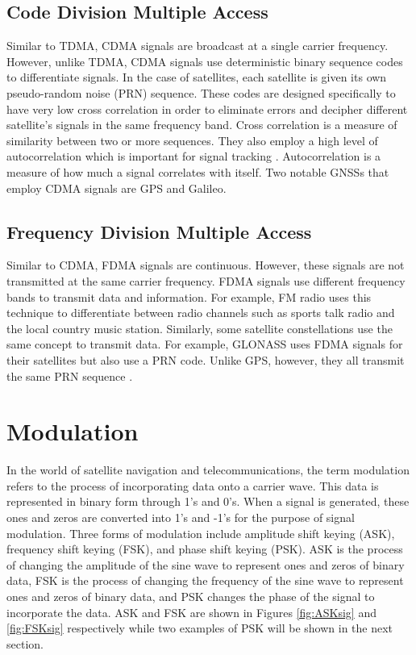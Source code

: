 \documentclass[12pt]{report}
\begin{document}
\subsection{Code Division Multiple Access}

Similar to TDMA, CDMA signals are broadcast at a single carrier frequency. However, unlike TDMA, CDMA signals use deterministic binary sequence codes to differentiate signals. In the case of satellites, each satellite is given its own pseudo-random noise (PRN) sequence. These codes are designed specifically to have very low cross correlation in order to eliminate errors and decipher different satellite's signals in the same frequency band. Cross correlation is a measure of similarity between two or more sequences. They also employ a high level of autocorrelation which is important for signal tracking \cite{goldOptimalBinarySequences1967}. Autocorrelation is a measure of how much a signal correlates with itself. Two notable GNSSs that employ CDMA signals are GPS and Galileo.

\subsection{Frequency Division Multiple Access}

Similar to CDMA, FDMA signals are continuous. However, these signals are not transmitted at the same carrier frequency. FDMA signals use different frequency bands to transmit data and information. For example, FM radio uses this technique to differentiate between radio channels such as sports talk radio and the local country music station. Similarly, some satellite constellations use the same concept to transmit data. For example, GLONASS uses FDMA signals for their satellites but also use a PRN code. Unlike GPS, however, they all transmit the same PRN sequence \cite{GLONASSSignalPlan}. 

\section{Modulation}
In the world of satellite navigation and telecommunications, the term modulation refers to the process of incorporating data onto a carrier wave. This data is represented in binary form through 1's and 0's. When a signal is generated, these ones and zeros are converted into 1's and -1's for the purpose of signal modulation. Three forms of modulation include amplitude shift keying (ASK), frequency shift keying (FSK), and phase shift keying (PSK). ASK is the process of changing the amplitude of the sine wave to represent ones and zeros of binary data, FSK is the process of changing the frequency of the sine wave to represent ones and zeros of binary data, and PSK changes the phase of the signal to incorporate the data. ASK and FSK are shown in Figures \ref{fig:ASKsig} and \ref{fig:FSKsig} respectively while two examples of PSK will be shown in the next section.
\end{document}
